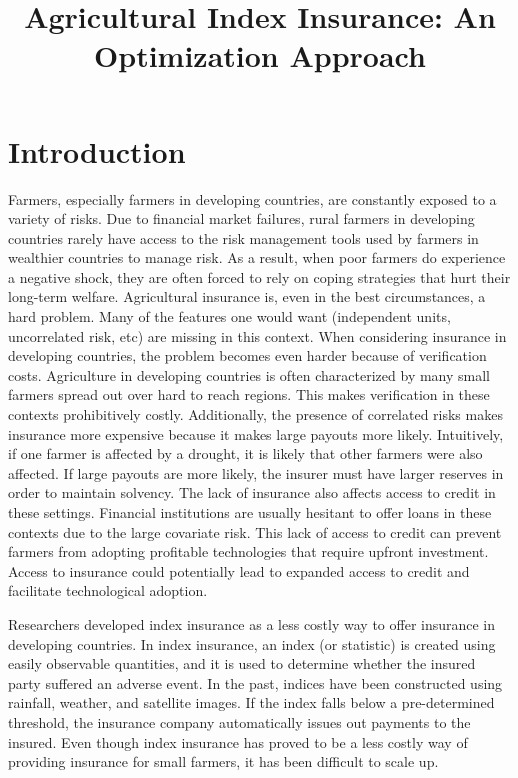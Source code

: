 \documentclass[12pt]{article}
\title{Agricultural Index Insurance: An Optimization Approach}
\date{}
\begin{document}
\maketitle
\vspace{-8em}
\section{Introduction}
Farmers, especially farmers in developing countries, are constantly exposed to a variety of risks. Due to financial market failures, rural farmers in developing countries rarely have access to the risk management tools used by farmers in wealthier countries to manage risk. As a result, when poor farmers do experience a negative shock, they are often forced to rely on coping strategies that hurt their long-term welfare. Agricultural insurance is, even in the best circumstances, a hard problem. Many of the features one would want (independent units, uncorrelated risk, etc) are missing in this context. When considering insurance in developing countries, the problem becomes even harder because of verification costs. Agriculture in developing countries is often characterized by many small farmers spread out over hard to reach regions. This makes verification in these contexts prohibitively costly. Additionally, the presence of correlated risks makes insurance more expensive because it makes large payouts more likely. Intuitively, if one farmer is affected by a drought, it is likely that other farmers were also affected. If large payouts are more likely, the insurer must have larger reserves in order to maintain solvency. The lack of insurance also affects access to credit in these settings. Financial institutions are usually hesitant to offer loans in these contexts due to the large covariate risk. This lack of access to credit can prevent farmers from adopting profitable technologies that require upfront investment. Access to insurance could potentially lead to expanded access to credit and facilitate technological adoption.
\par

Researchers developed index insurance as a less costly way to offer insurance in developing countries. In index insurance, an index (or statistic) is created using easily observable quantities, and it is used to determine whether the insured party suffered an adverse event. In the past, indices have been constructed using rainfall, weather, and satellite images. If the index falls below a pre-determined threshold, the insurance company automatically issues out payments to the insured. Even though index insurance has proved to be a less costly way of providing insurance for small farmers, it has been difficult to scale up.
\end{document}
